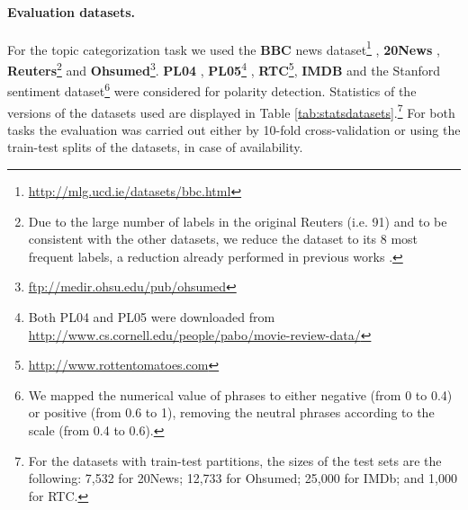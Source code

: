 \documentclass[11pt,a4paper]{article}
\begin{document}
\paragraph{Evaluation datasets.} 
For the topic categorization task we used the \textbf{BBC} news dataset\footnote{\url{http://mlg.ucd.ie/datasets/bbc.html}} 
\cite{greene2006practical}, \textbf{20News} \cite{lang1995newsweeder}, \textbf{Reuters}\footnote{Due to the large number of labels in the original Reuters (i.e. 91) and to be consistent with the other datasets, we reduce the dataset to its 8 most frequent labels, a reduction already performed in previous works \cite{sebastiani2002machine}.} 
\cite{lewis2004rcv1} and \textbf{Ohsumed}\footnote{\url{ftp://medir.ohsu.edu/pub/ohsumed}}. \textbf{PL04} \cite{Pang+Lee:04a}, \textbf{PL05}\footnote{Both PL04 and PL05 were downloaded from \url{http://www.cs.cornell.edu/people/pabo/movie-review-data/}}
\cite{Pang+Lee:05a}, \textbf{RTC}\footnote{\url{http://www.rottentomatoes.com}}, \textbf{IMDB} \cite{maas-EtAl:2011:ACL-HLT2011} and the Stanford sentiment dataset\footnote{We mapped the numerical value of phrases to either negative (from 0 to 0.4) or positive (from 0.6 to 1), removing the neutral phrases according to the scale (from 0.4 to 0.6).} \cite[\textbf{SF}]{SocherEtAl2013:RNTN}
were considered for polarity detection. Statistics of the versions of the datasets used are displayed in Table \ref{tab:statsdatasets}.\footnote{For the datasets with train-test partitions, the sizes of the test sets are the following: 7,532 for 20News; 12,733 for Ohsumed; 25,000 for IMDb; and 1,000 for RTC.} For both tasks the evaluation was carried out either by 10-fold cross-validation or using the train-test splits of the datasets, in case of availability.
\end{document}
